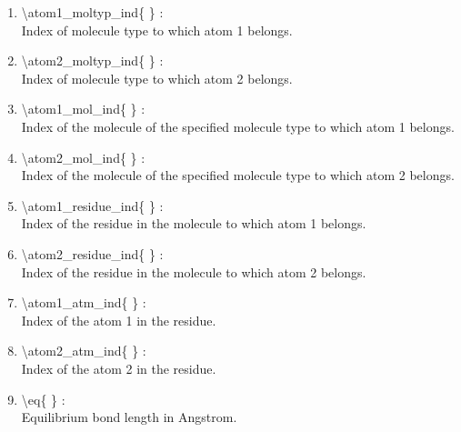 \documentclass[12pt,titlepage]{article}
\begin{document}
\begin{enumerate}

 \vspace{0.15in} 
 \item  \textbackslash atom1\_moltyp\_ind\{ \} : \\ 
    Index of molecule type to which atom 1 belongs.

 \vspace{0.15in} 
 \item  \textbackslash atom2\_moltyp\_ind\{ \} : \\ 
    Index of molecule type to which atom 2 belongs.

 \vspace{0.15in} 
 \item  \textbackslash atom1\_mol\_ind\{ \} : \\    
    Index of the molecule of the specified molecule type 
    to which atom 1 belongs.

 \vspace{0.15in} 
 \item  \textbackslash atom2\_mol\_ind\{ \} : \\    
    Index of the molecule of the specified molecule type 
    to which atom 2 belongs.

 \vspace{0.15in} 
 \item  \textbackslash atom1\_residue\_ind\{ \} : \\ 
    Index of the residue in the molecule to which atom 1 belongs.

 \vspace{0.15in} 
 \item  \textbackslash atom2\_residue\_ind\{ \} : \\ 
    Index of the residue in the molecule to which atom 2 belongs.

 \vspace{0.15in} 
 \item  \textbackslash atom1\_atm\_ind\{ \} : \\    
    Index of the atom 1 in the residue.
 
 \vspace{0.15in} 
 \item  \textbackslash atom2\_atm\_ind\{ \} : \\     
    Index of the atom 2 in the residue.
 
 \vspace{0.15in} 
 \item  \textbackslash eq\{ \} : \\               
    Equilibrium bond length in Angstrom.
  

\end{enumerate}
\end{document}
